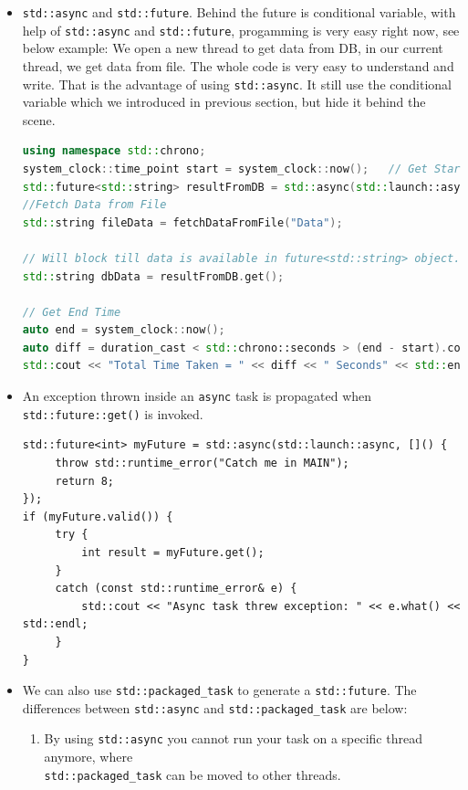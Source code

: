 \documentclass[a4paper,11pt,twoside]{book}
\begin{document}
\begin{itemize}
	\item \texttt{std::async} and \texttt{std::future}. Behind the future is conditional variable, with help of \texttt{std::async} and \texttt{std::future}, progamming is very easy right now, see below example: We open a new thread to get data from DB, in our current thread, we get data from file. The whole code is very easy to understand and write. That is the advantage of using \texttt{std::async}. It still use the conditional variable which we introduced in previous section, but hide it behind the scene. 
	
\begin{lstlisting}[frame=single, language=c++]
using namespace std::chrono;
system_clock::time_point start = system_clock::now(); 	// Get Start Time
std::future<std::string> resultFromDB = std::async(std::launch::async, fetchDataFromDB, "Data");
//Fetch Data from File
std::string fileData = fetchDataFromFile("Data");

// Will block till data is available in future<std::string> object.
std::string dbData = resultFromDB.get();

// Get End Time
auto end = system_clock::now();
auto diff = duration_cast < std::chrono::seconds > (end - start).count();
std::cout << "Total Time Taken = " << diff << " Seconds" << std::endl;
\end{lstlisting}	

    \item An exception thrown inside an \texttt{async} task is propagated when \texttt{std::future::get()} is invoked.

\begin{lstlisting}[]
std::future<int> myFuture = std::async(std::launch::async, []() {
     throw std::runtime_error("Catch me in MAIN");
     return 8;
});
if (myFuture.valid()) {
     try {
         int result = myFuture.get();
     }
     catch (const std::runtime_error& e) {
         std::cout << "Async task threw exception: " << e.what() << std::endl;
     }
}
\end{lstlisting}

	\item We can also use \texttt{std::packaged\_task} to generate a \texttt{std::future}. The differences between \texttt{std::async} and \texttt{std::packaged\_task} are below:

\begin{enumerate}
	\item By using \texttt{std::async} you cannot run your task on a specific thread anymore, where \\ \texttt{std::packaged\_task} can be moved to other threads.
	

\end{enumerate}
\end{itemize}
\end{document}
